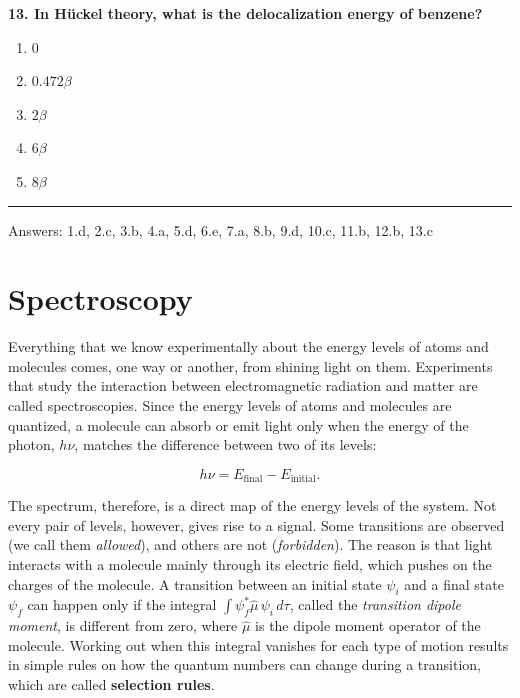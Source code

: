 \documentclass[
  english,
  9pt,
]{extbook}
\providecommand{\tightlist}{%
  \setlength{\itemsep}{0pt}\setlength{\parskip}{0pt}}
\theoremstyle{definition}
\theoremstyle{definition}
\theoremstyle{definition}
\theoremstyle{definition}
\theoremstyle{remark}
\begin{document}
\textbf{13. In Hückel theory, what is the delocalization energy of benzene?}

\begin{enumerate}
\def\labelenumi{\alph{enumi}.}
\tightlist
\item
  \(0\)\\
\item
  \(0.472\beta\)\\
\item
  \(2\beta\)\\
\item
  \(6\beta\)\\
\item
  \(8\beta\)
\end{enumerate}

\begin{center}\rule{0.5\linewidth}{0.5pt}\end{center}

Answers: 1.d, 2.c, 3.b, 4.a, 5.d, 6.e, 7.a, 8.b, 9.d, 10.c, 11.b, 12.b, 13.c

\chapter{Spectroscopy}\label{Spectroscopy}

Everything that we know experimentally about the energy levels of atoms and molecules comes, one way or another, from shining light on them. Experiments that study the interaction between electromagnetic radiation and matter are called spectroscopies. Since the energy levels of atoms and molecules are quantized, a molecule can absorb or emit light only when the energy of the photon, \(h\nu\), matches the difference between two of its levels:

\begin{equation}
h\nu = E_\text{final} - E_\text{initial}.
\label{eq:spec1}
\end{equation}

The spectrum, therefore, is a direct map of the energy levels of the system. Not every pair of levels, however, gives rise to a signal. Some transitions are observed (we call them \emph{allowed}), and others are not (\emph{forbidden}). The reason is that light interacts with a molecule mainly through its electric field, which pushes on the charges of the molecule. A transition between an initial state \(\psi_i\) and a final state \(\psi_f\) can happen only if the integral \(\int \psi_f^* \hat{\mu}\, \psi_i\, d\tau\), called the \emph{transition dipole moment}, is different from zero, where \(\hat{\mu}\) is the dipole moment operator of the molecule. Working out when this integral vanishes for each type of motion results in simple rules on how the quantum numbers can change during a transition, which are called \textbf{selection rules}.
\end{document}
